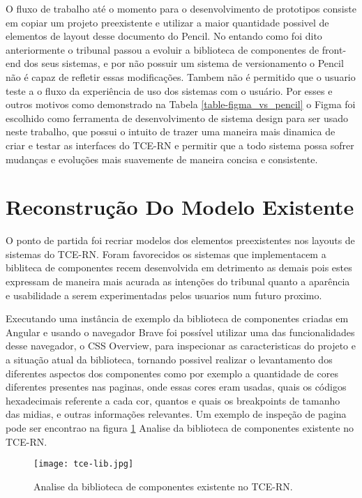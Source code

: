   O fluxo de trabalho até o momento para o desenvolvimento de prototipos consiste em copiar um projeto preexistente e utilizar a maior quantidade possivel de elementos de layout desse documento do Pencil. No entando como foi dito anteriormente o tribunal passou a evoluir a biblioteca de componentes de front-end dos seus sistemas, e por não possuir um sistema de versionamento o Pencil não é capaz de refletir essas modificações. Tambem não é permitido que o usuario teste a o fluxo da experiência de uso dos sistemas com o usuário. Por esses e outros motivos como demonstrado na Tabela \ref{table-figma_vs_pencil} o Figma foi escolhido como ferramenta de desenvolvimento de sistema design para ser usado neste trabalho, que possui o intuito de trazer uma maneira mais dinamica de criar e testar as interfaces do TCE-RN e permitir que a todo sistema possa sofrer mudanças e evoluções mais suavemente de maneira concisa e consistente.

\section{Reconstrução Do Modelo Existente} \label{secao32}

  O ponto de partida foi recriar modelos dos elementos preexistentes nos layouts de sistemas do TCE-RN. Foram favorecidos os sistemas que implementacem a bibliteca de componentes recem desenvolvida em detrimento as demais pois estes expressam de maneira mais acurada as intenções do tribunal quanto a aparência e usabilidade a serem experimentadas pelos usuarios num futuro proximo.

  Executando uma instância de exemplo da biblioteca de componentes criadas em Angular e usando o navegador Brave foi possível utilizar uma das funcionalidades desse navegador, o CSS Overview, para inspecionar as caracteristicas do projeto e a situação atual da biblioteca, tornando possivel realizar o levantamento dos diferentes aspectos dos componentes como por exemplo a quantidade de cores diferentes presentes nas paginas, onde essas cores eram usadas, quais os códigos hexadecimais referente a cada cor, quantos e quais os breakpoints de tamanho das midias, e outras informações relevantes. Um exemplo de inspeção de pagina pode ser encontrao na figura \ref{fig:tcenglib} Analise da biblioteca de componentes existente no TCE-RN.

  \begin{figure}[!h]
    \texttt{[image: tce-lib.jpg]}
    \caption{Analise da biblioteca de componentes existente no TCE-RN.}
    \label{fig:tcenglib}
  \end{figure}

